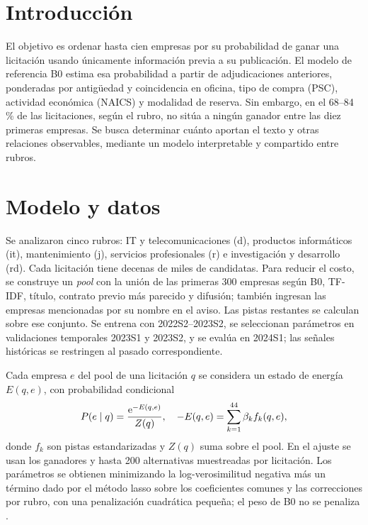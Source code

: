 \section{Introducción}
El objetivo es ordenar hasta cien empresas por su probabilidad de ganar una licitación usando únicamente información previa a su publicación. El modelo de referencia B0 estima esa probabilidad a partir de adjudicaciones anteriores, ponderadas por antigüedad y coincidencia en oficina, tipo de compra (PSC), actividad económica (NAICS) y modalidad de reserva. Sin embargo, en el 68--84\,\% de las licitaciones, según el rubro, no sitúa a ningún ganador entre las diez primeras empresas. Se busca determinar cuánto aportan el texto y otras relaciones observables, mediante un modelo interpretable y compartido entre rubros.

\section{Modelo y datos}
Se analizaron cinco rubros: IT y telecomunicaciones (d), productos informáticos (it), mantenimiento (j), servicios profesionales (r) e investigación y desarrollo (rd). Cada licitación tiene decenas de miles de candidatas. Para reducir el costo, se construye un \emph{pool} con la unión de las primeras 300 empresas según B0, TF-IDF, título, contrato previo más parecido y difusión; también ingresan las empresas mencionadas por su nombre en el aviso. Las pistas restantes se calculan sobre ese conjunto. Se entrena con 2022S2--2023S2, se seleccionan parámetros en validaciones temporales 2023S1 y 2023S2, y se evalúa en 2024S1; las señales históricas se restringen al pasado correspondiente.

Cada empresa $e$ del pool de una licitación $q$ se considera un estado de energía $E(q,e)$, con probabilidad condicional
\begin{equation}
 P(e\mid q)=\frac{\mathrm{e}^{-E(q,e)}}{Z(q)},\quad
 -E(q,e)=\sum_{k=1}^{44}\beta_k f_k(q,e),
 \label{eq:boltz}
\end{equation}
donde $f_k$ son pistas estandarizadas y $Z(q)$ suma sobre el pool. En el ajuste se usan los ganadores y hasta 200 alternativas muestreadas por licitación. Los parámetros se obtienen minimizando la log-verosimilitud negativa más un término dado por el método lasso sobre los coeficientes comunes y las correcciones por rubro, con una penalización cuadrática pequeña; el peso de B0 no se penaliza \cite{mcfadden1974,tibshirani1996}. %

